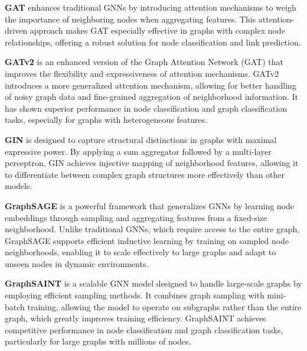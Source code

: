 \textbf{GAT} \cite{velivckovic2017gat} enhances traditional GNNs by introducing attention mechanisms to weigh the importance of neighboring nodes when aggregating features. This attention-driven approach makes GAT especially effective in graphs with complex node relationships, offering a robust solution for node classification and link prediction.

\textbf{GATv2} \cite{brody2021gatv2} is an enhanced version of the Graph Attention Network (GAT) that improves the flexibility and expressiveness of attention mechanisms. GATv2 introduces a more generalized attention mechanism, allowing for better handling of noisy graph data and fine-grained aggregation of neighborhood information. It has shown superior performance in node classification and graph classification tasks, especially for graphs with heterogeneous features.



\textbf{GIN}  \cite{xu2018gin} is designed to capture structural distinctions in graphs with maximal expressive power. By applying a sum aggregator followed by a multi-layer perceptron, GIN achieves injective mapping of neighborhood features, allowing it to differentiate between complex graph structures more effectively than other models.


\textbf{GraphSAGE} \cite{hamilton2017graphsage} is a powerful framework that generalizes GNNs by learning node embeddings through sampling and aggregating features from a fixed-size neighborhood. Unlike traditional GNNs, which require access to the entire graph, GraphSAGE supports efficient inductive learning by training on sampled node neighborhoods, enabling it to scale effectively to large graphs and adapt to unseen nodes in dynamic environments. 

\textbf{GraphSAINT} \cite{zeng2019graphsaint} is a scalable GNN model designed to handle large-scale graphs by employing efficient sampling methods. It combines graph sampling with mini-batch training, allowing the model to operate on subgraphs rather than the entire graph, which greatly improves training efficiency. GraphSAINT achieves competitive performance in node classification and graph classification tasks, particularly for large graphs with millions of nodes.

